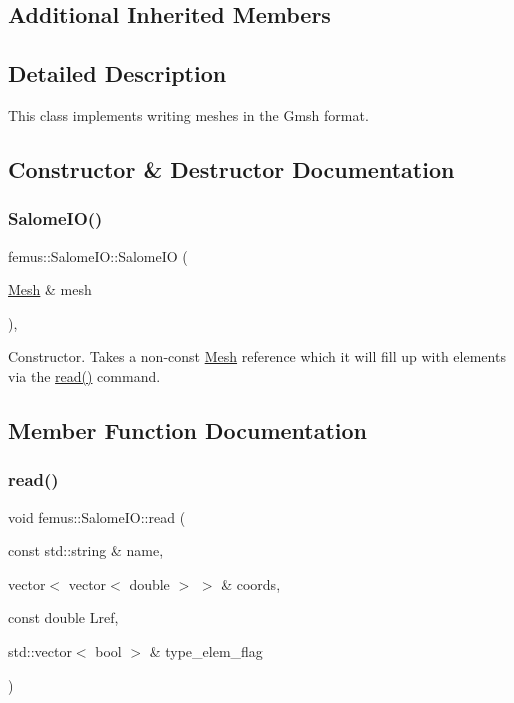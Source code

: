 \subsection*{Additional Inherited Members}


\subsection{Detailed Description}
This class implements writing meshes in the Gmsh format. 

\subsection{Constructor \& Destructor Documentation}
\mbox{\label{classfemus_1_1_salome_i_o_a6ccc4b0e60f801d79a60484e894bc056}} 
\subsubsection{\texorpdfstring{Salome\+I\+O()}{SalomeIO()}}
{\footnotesize\ttfamily femus\+::\+Salome\+I\+O\+::\+Salome\+IO (\begin{DoxyParamCaption}\item[{\mbox{\hyperlink{classfemus_1_1_mesh}{Mesh}} \&}]{mesh }\end{DoxyParamCaption})\hspace{0.3cm}{\ttfamily [inline]}, {\ttfamily [explicit]}}

Constructor. Takes a non-\/const \mbox{\hyperlink{classfemus_1_1_mesh}{Mesh}} reference which it will fill up with elements via the \mbox{\hyperlink{classfemus_1_1_salome_i_o_a2cd7f5327fe664747acc0131bf6a657e}{read()}} command. 

\subsection{Member Function Documentation}
\mbox{\label{classfemus_1_1_salome_i_o_a2cd7f5327fe664747acc0131bf6a657e}} 
\subsubsection{\texorpdfstring{read()}{read()}}
{\footnotesize\ttfamily void femus\+::\+Salome\+I\+O\+::read (\begin{DoxyParamCaption}\item[{const std\+::string \&}]{name,  }\item[{vector$<$ vector$<$ double $>$ $>$ \&}]{coords,  }\item[{const double}]{Lref,  }\item[{std\+::vector$<$ bool $>$ \&}]{type\+\_\+elem\+\_\+flag }\end{DoxyParamCaption})\hspace{0.3cm}{\ttfamily [virtual]}}

